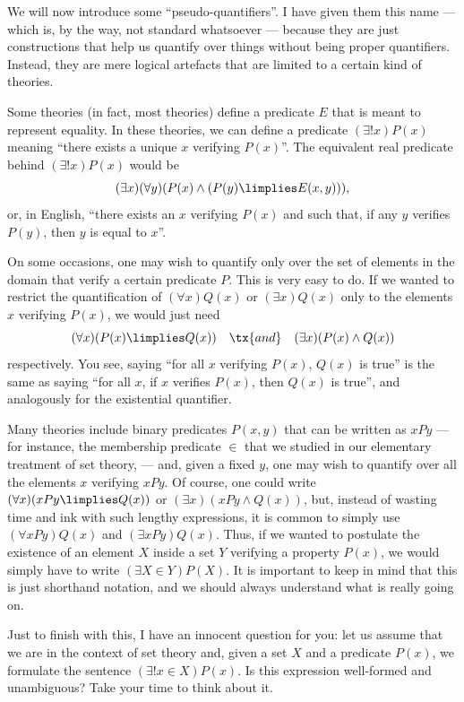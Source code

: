 \begin{para}
\label{pseudoquan}
We will now introduce some ``pseudo-quantifiers''.
I have given them this name --- which is, by the way, not standard whatsoever --- because they are just constructions that help us quantify over things without being proper quantifiers.
Instead, they are mere logical artefacts that are limited to a certain kind of theories.

Some theories (in fact, most theories) define a predicate $E$ that is meant to represent equality. In these theories, we can define a predicate $(\exists! x)P(x)$ meaning ``there exists a unique $x$ verifying $P(x)$''. The equivalent real predicate behind $(\exists! x)P(x)$ would be
\[(\exists x)(\forall y) (P(x) \land (P(y)\limplies E(x,y))),\]
or, in English, ``there exists an $x$ verifying $P(x)$ and such that, if any $y$ verifies $P(y)$, then $y$ is equal to $x$''.

On some occasions, one may wish to quantify only over the set of elements in the domain that verify a certain predicate $P$.
This is very easy to do. If we wanted to restrict the quantification of $(\forall x)Q(x)$ or $(\exists x)Q(x)$ only to the elements $x$ verifying $P(x)$, we would just need
\[ (\forall x)(P(x)\limplies Q(x)) \quad \tx{and} \quad  (\exists x)(P(x) \land Q(x))\]
respectively.
You see, saying ``for all $x$ verifying $P(x)$, $Q(x)$ is true'' is the same as saying ``for all $x$, if $x$ verifies $P(x)$, then $Q(x)$ is true'', and analogously for the existential quantifier.

Many theories include binary predicates $P(x,y)$ that can be written as $xPy$ --- for instance, the membership predicate $\in$ that we studied in our elementary treatment of set theory, --- and, given a fixed $y$, one may wish to quantify over all the elements $x$ verifying $xPy$.
Of course, one could write $(\forall x)(xPy\limplies Q(x))$ or $(\exists x)(xPy\land Q(x))$, but, instead of wasting time and ink with such lengthy expressions, it is common to simply use $(\forall x P y)Q(x)$ and $(\exists x P y) Q(x)$.
Thus, if we wanted to postulate the existence of an element $X$ inside a set $Y$ verifying a property $P(x)$, we would simply have to write $(\exists X \in Y)P(X)$. 
It is important to keep in mind that this is just shorthand notation, and we should always understand what is really going on.

Just to finish with this, I have an innocent question for you: let us assume that we are in the context of set theory and, given a set $X$ and a predicate $P(x)$, we formulate the sentence $(\exists! x \in X) P(x)$.
Is this expression well-formed and unambiguous? Take your time to think about it.


\end{para}
